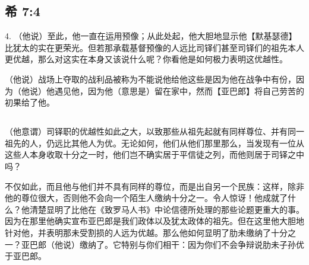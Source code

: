 
\subsection{希 7:4}

4. （他说）至此，他一直在运用预像；从此处起，他大胆地显示他【默基瑟德】比犹太的实在更荣光。但若那承载基督预像的人远比司铎们甚至司铎们的祖先本人更优越，那么对这实在本身又该说什么呢？你看他是如何极力表明这优越性。\par

（他说）战场上夺取的战利品被称为不能说他给他这些是因为他在战争中有份，因为（他说）他遇见他，因为他（意思是）留在家中，然而【亚巴郎】将自己劳苦的初果给了他。\par


\subsection{}

\par

（他意谓）司铎职的优越性如此之大，以致那些从祖先起就有同样尊位、并有同一祖先的人，仍远比其他人为优。无论如何，他们从他们那里那么，当发现有一位从这些人本身收取十分之一时，他们岂不确实居于平信徒之列，而他则居于司铎之中吗？\par

不仅如此，而且他与他们并不具有同样的尊位，而是出自另一个民族：这样，除非他的尊位很大，否则他不会向一个陌生人缴纳十分之一。令人惊讶！他成就了什么？他清楚显明了比他在《致罗马人书》中论信德所处理的那些论题更重大的事。因为在那里他确实宣布亚巴郎是我们政体以及犹太政体的祖先。但在这里他大胆地针对他，并表明那未受割损的人远为优越。那么他如何显明了肋未缴纳了十分之一？亚巴郎（他说）缴纳了。它特别与你们相干：因为你们不会争辩说肋未子孙优于亚巴郎。\par


